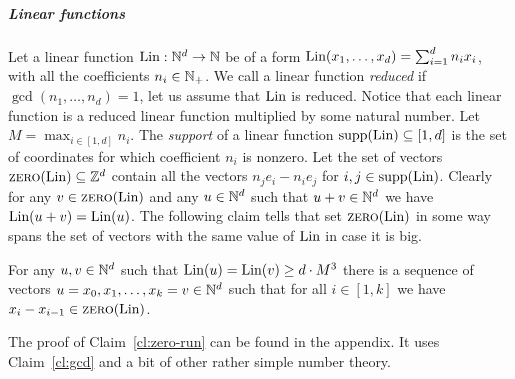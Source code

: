 \subparagraph*{Linear functions}
Let a linear function $\textup{Lin}: \mathbb{N}^d \to \mathbb{N}$ be of a form $\textup{Lin}(x_1, \ldots, x_d) = \sum_{i=1}^d n_i x_i$, with all the coefficients $n_i \in \mathbb{N}_+$.
We call a linear function \emph{reduced} if $\gcd(n_1, \ldots, n_d) = 1$, let us assume that $\textup{Lin}$ is reduced.
Notice that each linear function is a reduced linear function multiplied by some natural number.
Let $M = \max_{i \in [1,d]} n_i$.
The \emph{support} of a linear function $\textup{supp}(\textup{Lin}) \subseteq [1,d]$ is the set of coordinates
for which coefficient $n_i$ is nonzero.
Let the set of vectors $\textsc{zero}(\textup{Lin}) \subseteq \mathbb{Z}^d$ contain all the vectors $n_j e_i - n_i e_j$
for $i, j \in \textup{supp}(\textup{Lin})$. Clearly for any $v \in \textsc{zero}(\textup{Lin})$ and any $u \in \mathbb{N}^d$ such that
$u+v \in \mathbb{N}^d$ we have $\textup{Lin}(u+v) = \textup{Lin}(u)$.
The following claim tells that set $\textsc{zero}(\textup{Lin})$ in some way spans the set of vectors with the same value
of $\textup{Lin}$ in case it is big.

\begin{claim}\label{cl:zero-run}
For any $u, v \in \mathbb{N}^d$ such that $\textup{Lin}(u) = \textup{Lin}(v) \geq d \cdot M^3$ there is a sequence of
vectors $u = x_0, x_1, \ldots, x_k = v \in \mathbb{N}^d$ such that for all $i \in [1,k]$ we have $x_i - x_{i-1} \in \textsc{zero}(\textup{Lin})$.
\end{claim}

The proof of Claim~\ref{cl:zero-run} can be found in the appendix. It uses Claim~\ref{cl:gcd} and a bit
of other rather simple number theory.

